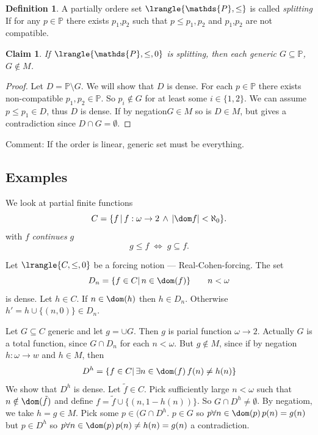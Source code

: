 \documentclass[11pt,pdftex,twoside,a4paper]{article}
\newcommand{\dsP}{\ensuremath{\mathds{P}}}
\newtheorem{claim}[thm]{Claim}
\theoremstyle{definition}
\newtheorem{ldef}[thm]{Definition}
\begin{document}
\begin{ldef}
A partially ordere set \(\lrangle{\dsP,\leq}\) is called \emph{splitting}
If for any \(p\in\dsP\) there exists \(p_1\),\(p_2\) such that
\(p\leq p_1,p_2\) and \(p_1\),\(p_2\) are not compatible.
\end{ldef}

\begin{claim}
If \(\lrangle{\dsP,\leq,0}\) is splitting,
then each generic \(G\subseteq \dsP\),
\(G\notin M\).
\end{claim}
\begin{proof}
Let \(D = \dsP\setminus G\). We will show that $D$ is dense.
For each \(p\in\dsP\) there exists non-compatible \(p_1,p_2\in\dsP\).
So \(p_i\notin G\) for at least some \(i\in\{1,2\}\).
We can assume \(p\leq p_1 \in D\), thus $D$ is dense.
If by negation\(G\in M\) so is \(D\in M\),
but gives a contradiction since \(D\cap G=\emptyset\).
\end{proof}
Comment: If the order is linear, generic set must be everything.

\subsection{Examples}
We look at partial finite functions
\begin{equation*}
C = \{f\,|\, f:\omega\to 2\,\land\,|\dom f|<\aleph_0\}.
\end{equation*}
with $f$ \emph{continues} $g$
\begin{equation*}
g \leq f \; \Leftrightarrow \; g \subseteq f.
\end{equation*}

Let \(\lrangle{C,\leq,0}\) be a forcing notion
--- Real-Cohen-forcing.
The set
\begin{equation*}
D_n = \{f\in C|\, n\in \dom(f)\}\qquad n < \omega
\end{equation*}
is dense. Let \(h\in C\). If \(n\in \dom(h)\) then \(h\in D_n\).
Otherwise \(h' = h\cup\{(n,0)\} \in D_n\).

Let \(G\subseteq C\) generic and let \(g = \cup G\).
Then $g$ is parial function \(\omega \to 2\).
Actually $G$ is a total function, since \(G\cap D_n\) for each \(n<\omega\).
But \(g\notin M\), since if by negation \(h:\omega\to w\) and \(h\in M\),
then
\begin{equation*}
D^h = \{f\in C|\, \exists n\in \dom(f)\, f(n)\neq h(n)\}
\end{equation*}
We show that \(D^h\) is dense.
Let \(\tilde{f} \in C\). Pick sufficiently large \(n<\omega\)
such that \(n\notin\dom(\tilde{f})\) and define
\(f = \tilde{f}\cup \{(n, 1 - h(n))\}\).
So \(G\cap D^h \neq \emptyset\).
By negatiom, we take \(h=g\in M\).
Pick some \(p\in (G\cap D^h\).
\(p\in G\) so
\(p\forall n\in \dom(p)\, p(n)=g(n)\)
but \(p\in D^h\) so
\(p\forall n\in \dom(p)\, p(n)\neq h(n)=g(n)\)
a contradiction.
\end{document}
